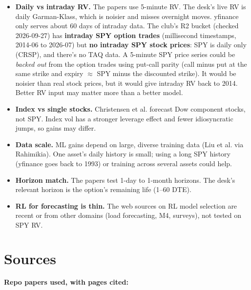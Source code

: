 \documentclass{article}
\begin{document}
\begin{itemize}

\item \textbf{Daily vs intraday RV.} The papers use 5-minute RV. The desk's live RV is daily Garman-Klass, which is noisier and misses overnight moves. yfinance only serves about 60 days of intraday data. The club's R2 bucket (checked 2026-09-27) has \textbf{intraday SPY option trades} (millisecond timestamps, 2014-06 to 2026-07) but \textbf{no intraday SPY stock prices}: SPY is daily only (CRSP), and there's no TAQ data. A 5-minute SPY price series could be \emph{backed out} from the option trades using put-call parity (call minus put at the same strike and expiry \ensuremath{\approx} SPY minus the discounted strike). It would be noisier than real stock prices, but it would give intraday RV back to 2014. Better RV input may matter more than a better model.

\item \textbf{Index vs single stocks.} Christensen et al. forecast Dow component stocks, not SPY. Index vol has a stronger leverage effect and fewer idiosyncratic jumps, so gains may differ.

\item \textbf{Data scale.} ML gains depend on large, diverse training data (Liu et al. via Rahimikia). One asset's daily history is small; using a long SPY history (yfinance goes back to 1993) or training across several assets could help.

\item \textbf{Horizon match.} The papers test 1-day to 1-month horizons. The desk's relevant horizon is the option's remaining life (1--60 DTE).

\item \textbf{RL for forecasting is thin.} The web sources on RL model selection are recent or from other domains (load forecasting, M4, surveys), not tested on SPY RV.

\end{itemize}

\section{Sources}

\textbf{Repo papers used, with pages cited:}
\end{document}
